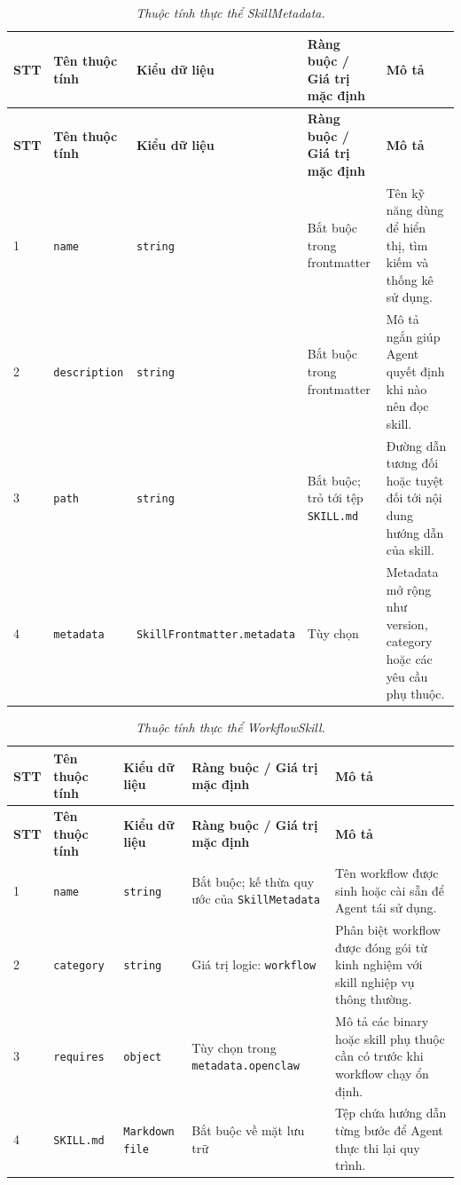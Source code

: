 \begin{longtable}{|p{0.55cm}|p{2.55cm}|p{2.7cm}|p{3.25cm}|p{4.0cm}|}
\caption{\emph{Thuộc tính thực thể SkillMetadata.}}\label{tab:erd-skill-metadata}\\
\hline
\textbf{STT} & \textbf{Tên thuộc tính} & \textbf{Kiểu dữ liệu} & \textbf{Ràng buộc / Giá trị mặc định} & \textbf{Mô tả} \\
\hline
\endfirsthead
\hline
\textbf{STT} & \textbf{Tên thuộc tính} & \textbf{Kiểu dữ liệu} & \textbf{Ràng buộc / Giá trị mặc định} & \textbf{Mô tả} \\
\hline
\endhead
1 & \texttt{name} & \texttt{string} & Bắt buộc trong frontmatter & Tên kỹ năng dùng để hiển thị, tìm kiếm và thống kê sử dụng. \\
\hline
2 & \texttt{description} & \texttt{string} & Bắt buộc trong frontmatter & Mô tả ngắn giúp Agent quyết định khi nào nên đọc skill. \\
\hline
3 & \texttt{path} & \texttt{string} & Bắt buộc; trỏ tới tệp \texttt{SKILL.md} & Đường dẫn tương đối hoặc tuyệt đối tới nội dung hướng dẫn của skill. \\
\hline
4 & \texttt{metadata} & \texttt{Skill}\newline\texttt{Frontmatter.}\newline\texttt{metadata} & Tùy chọn & Metadata mở rộng như version, category hoặc các yêu cầu phụ thuộc. \\
\hline
\end{longtable}

\begin{longtable}{|p{0.55cm}|p{2.55cm}|p{2.7cm}|p{3.25cm}|p{4.0cm}|}
\caption{\emph{Thuộc tính thực thể WorkflowSkill.}}\label{tab:erd-workflow-skill}\\
\hline
\textbf{STT} & \textbf{Tên thuộc tính} & \textbf{Kiểu dữ liệu} & \textbf{Ràng buộc / Giá trị mặc định} & \textbf{Mô tả} \\
\hline
\endfirsthead
\hline
\textbf{STT} & \textbf{Tên thuộc tính} & \textbf{Kiểu dữ liệu} & \textbf{Ràng buộc / Giá trị mặc định} & \textbf{Mô tả} \\
\hline
\endhead
1 & \texttt{name} & \texttt{string} & Bắt buộc; kế thừa quy ước của \texttt{SkillMetadata} & Tên workflow được sinh hoặc cài sẵn để Agent tái sử dụng. \\
\hline
2 & \texttt{category} & \texttt{string} & Giá trị logic: \texttt{workflow} & Phân biệt workflow được đóng gói từ kinh nghiệm với skill nghiệp vụ thông thường. \\
\hline
3 & \texttt{requires} & \texttt{object} & Tùy chọn trong \texttt{metadata.openclaw} & Mô tả các binary hoặc skill phụ thuộc cần có trước khi workflow chạy ổn định. \\
\hline
4 & \texttt{SKILL.md} & \texttt{Markdown file} & Bắt buộc về mặt lưu trữ & Tệp chứa hướng dẫn từng bước để Agent thực thi lại quy trình. \\
\hline
\end{longtable}

